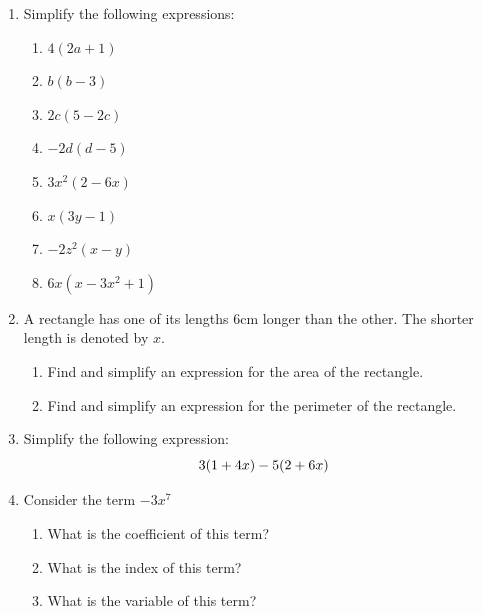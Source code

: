 \documentclass[12pt]{article}
\begin{document}
\begin{enumerate}
    \item Simplify the following expressions:
    \begin{enumerate}
        \item \(4(2a+1)\)
        \vspace{2cm}
        \item \(b(b-3)\)
        \vspace{2cm}
        \item \(2c(5-2c)\)
        \vspace{2cm}
        \item \(-2d(d-5)\)
        \vspace{2cm}
        \item \(3x^2(2-6x)\)
        \vspace{2cm}
        \item \(x(3y-1)\)
        \vspace{2cm}
        \item \(-2z^2(x-y)\)
        \vspace{2cm}
        \item \(6x(x-3x^2+1)\)
        \vspace{2cm}
    \end{enumerate}

    \item A rectangle has one of its lengths 6cm longer than the other. The shorter length is denoted by \(x\).
    
    \begin{enumerate}
        \item Find and simplify an expression for the area of the rectangle.
        \vspace{3cm}
        \item Find and simplify an expression for the perimeter of the rectangle.
        \vspace{3cm}
    \end{enumerate}

    \item Simplify the following expression:
    \[
    3(1+4x) - 5(2+6x)
    \vspace{3cm}
    \]

    \item Consider the term \(-3x^7\)

    \begin{enumerate}
        \item What is the coefficient of this term?
        \vspace{2cm}
        \item What is the index of this term?
        \vspace{2cm}
        \item What is the variable of this term?
        \vspace{2cm}
    \end{enumerate}


\end{enumerate}
\end{document}
